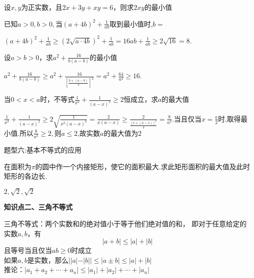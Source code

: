 \documentclass[11pt,a4paper]{ctexbook}
\begin{document}
\par
\begin{problem}
    设$x,y$为正实数，且$2x+3y+xy=6$，则求$2xy$的最小值
\end{problem}

\par
\begin{problem}
    已知$a>0,b>0,$当$\displaystyle (a+4b)^2+\frac{1}{ab}$取到最小值时,$b=$
    \begin{jiexi}
        $\displaystyle (a+4b)^2+\frac{1}{ab}\ge(2\sqrt{a\cdot4b})^2+\frac{1}{ab}=16ab+\frac{1}{ab}\ge 2\sqrt{16}=8$.
    \end{jiexi}
\end{problem}

\par
\begin{problem}
    设$a>b>0$，求$\displaystyle a^2+\frac{16}{b(a-b)}$的最小值
    \begin{jiexi}
        $\displaystyle a^2+\frac{16}{b(a-b)}\ge a^2+\frac{16}{[\frac{b+(a-b)}{2}]^2}=a^2+\frac{64}{a^2}\ge16$.
    \end{jiexi}
\end{problem}

\par
\begin{problem}
    当$0<x<a$时，不等式$\displaystyle \frac{1}{x^2}+\frac{1}{(a-x)^2}\ge2$恒成立，求$a$的最大值
    \begin{jiexi}
        $\displaystyle \frac{1}{x^2}+\frac{1}{(a-x)^2}\ge 2\sqrt{\frac{1}{x^2(a-x)^2}}=\frac{2}{x(a-x)}\ge \frac{2}{\frac{[x+(a-x)]^2}{4}}=\frac{8}{a^2}$.当且仅当$x=\frac{a}{2}$时,取得最小值.所以$\displaystyle \frac{8}{a^2}\ge2,\text{则}a\le2$,故实数$a$的最大值为2
    \end{jiexi}
\end{problem}




\begin{tcolorbox} 
    题型六:基本不等式的应用
\end{tcolorbox}

\par
\begin{problem}
    在面积为$\pi$的圆中作一个内接矩形，使它的面积最大.求此矩形面积的最大值及此时矩形的各边长.
    \begin{jiexi}
        $2,\sqrt{2},\sqrt{2}$
    \end{jiexi}
\end{problem}


\begin{formal}
    {\large \textbf{知识点二、三角不等式}}
\end{formal}
三角不等式：两个实数和的绝对值小于等于他们绝对值的和，
即对于任意给定的实数$a,b$，有$$|a+b|\le|a|+|b|$$且等号当且仅当$ab\ge0$时成立\\
如果$a,b$是实数，那么$||a|-|b||\le|a\pm b|\le |a|+|b|$\\
推论：$|a_1+a_2+\cdots+a_n|\le |a_1|+|a_2|+\cdots+|a_n|$
\end{document}
